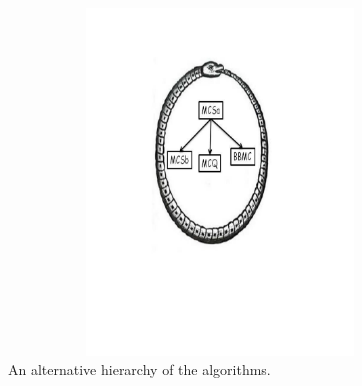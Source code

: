 \documentclass{l4proj}
\begin{document}
\begin{figure}
\centering
\includegraphics[height=9.2cm,width=13.2cm]{uroboros.pdf}
\vspace{-30mm}
\caption{An alternative hierarchy of the algorithms.}
\label{uroborus}
\end{figure}
\end{document}
